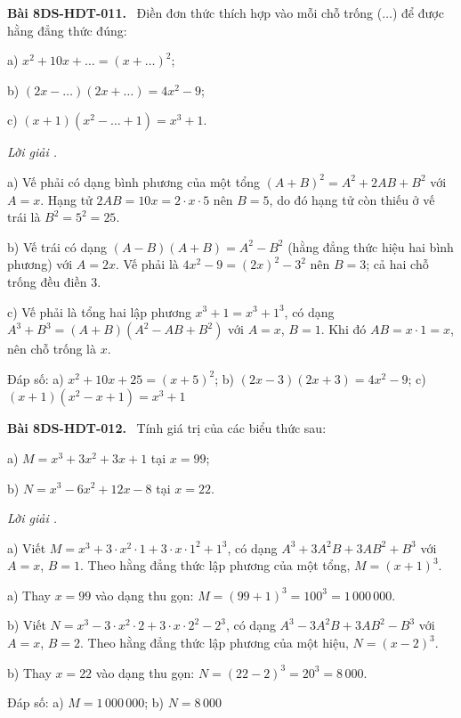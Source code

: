 \documentclass[12pt,a4paper]{article}
\newenvironment{problem}[1][]{\par\medskip\noindent\textbf{Bài #1.}\ }{\par}
\newenvironment{solution}[1][]{\par\noindent\textit{Lời giải #1.}\par}{\par}
\begin{document}
\begin{problem}[8DS-HDT-011]
Điền đơn thức thích hợp vào mỗi chỗ trống ($\ldots$) để được hằng đẳng thức đúng:

a) $x^2 + 10x + \ldots = (x + \ldots)^2$;

b) $(2x - \ldots)(2x + \ldots) = 4x^2 - 9$;

c) $(x + 1)(x^2 - \ldots + 1) = x^3 + 1$.

\begin{solution}
a) Vế phải có dạng bình phương của một tổng $(A + B)^2 = A^2 + 2AB + B^2$ với $A = x$. Hạng tử $2AB = 10x = 2 \cdot x \cdot 5$ nên $B = 5$, do đó hạng tử còn thiếu ở vế trái là $B^2 = 5^2 = 25$.

b) Vế trái có dạng $(A - B)(A + B) = A^2 - B^2$ (hằng đẳng thức hiệu hai bình phương) với $A = 2x$. Vế phải là $4x^2 - 9 = (2x)^2 - 3^2$ nên $B = 3$; cả hai chỗ trống đều điền $3$.

c) Vế phải là tổng hai lập phương $x^3 + 1 = x^3 + 1^3$, có dạng $A^3 + B^3 = (A + B)(A^2 - AB + B^2)$ với $A = x$, $B = 1$. Khi đó $AB = x \cdot 1 = x$, nên chỗ trống là $x$.

Đáp số: a) $\boxed{x^2 + 10x + 25 = (x + 5)^2}$; b) $\boxed{(2x - 3)(2x + 3) = 4x^2 - 9}$; c) $\boxed{(x + 1)(x^2 - x + 1) = x^3 + 1}$
\end{solution}
\end{problem}

\begin{problem}[8DS-HDT-012]
Tính giá trị của các biểu thức sau:

a) $M = x^3 + 3x^2 + 3x + 1$ tại $x = 99$;

b) $N = x^3 - 6x^2 + 12x - 8$ tại $x = 22$.

\begin{solution}
a) Viết $M = x^3 + 3 \cdot x^2 \cdot 1 + 3 \cdot x \cdot 1^2 + 1^3$, có dạng $A^3 + 3A^2B + 3AB^2 + B^3$ với $A = x$, $B = 1$. Theo hằng đẳng thức lập phương của một tổng, $M = (x + 1)^3$.

a) Thay $x = 99$ vào dạng thu gọn: $M = (99 + 1)^3 = 100^3 = 1\,000\,000$.

b) Viết $N = x^3 - 3 \cdot x^2 \cdot 2 + 3 \cdot x \cdot 2^2 - 2^3$, có dạng $A^3 - 3A^2B + 3AB^2 - B^3$ với $A = x$, $B = 2$. Theo hằng đẳng thức lập phương của một hiệu, $N = (x - 2)^3$.

b) Thay $x = 22$ vào dạng thu gọn: $N = (22 - 2)^3 = 20^3 = 8\,000$.

Đáp số: a) $\boxed{M = 1\,000\,000}$; b) $\boxed{N = 8\,000}$
\end{solution}
\end{problem}
\end{document}
